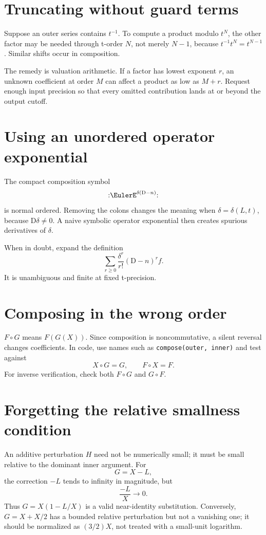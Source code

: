 \documentclass[11pt,openany]{book}
\theoremstyle{definition}
\theoremstyle{plain}
\theoremstyle{remark}
\newcommand{\Dop}{\mathrm{D}}
\newcommand{\compose}{\mathbin{\circ}}
\begin{document}
\section{Truncating without guard terms}
Suppose an outer series contains \(t^{-1}\).  To compute a product modulo
\(t^N\), the other factor may be needed through t-order \(N\), not merely
\(N-1\), because \(t^{-1}t^N=t^{N-1}\).  Similar shifts occur in composition.

The remedy is valuation arithmetic.  If a factor has lowest exponent \(r\), an
unknown coefficient at order \(M\) can affect a product as low as \(M+r\).
Request enough input precision so that every omitted contribution lands at or
beyond the output cutoff.

\section{Using an unordered operator exponential}
The compact composition symbol
\[
 \mathopen{:}\EulerE^{\delta(\Dop-n)}\mathclose{:}
\]
is normal ordered.  Removing the colons changes the meaning when
\(\delta=\delta(L,t)\), because \(\Dop\delta\ne0\).  A naive symbolic operator
exponential then creates spurious derivatives of \(\delta\).

When in doubt, expand the definition
\[
 \sum_{r\ge0}\frac{\delta^r}{r!}(\Dop-n)^rf.
\]
It is unambiguous and finite at fixed t-precision.

\section{Composing in the wrong order}
\(F\compose G\) means \(F(G(X))\).  Since composition is noncommutative, a
silent reversal changes coefficients.  In code, use names such as
\texttt{compose(outer, inner)} and test against
\[
 X\compose G=G,
 \qquad
 F\compose X=F.
\]
For inverse verification, check both \(F\compose G\) and \(G\compose F\).

\section{Forgetting the relative smallness condition}
An additive perturbation \(H\) need not be numerically small; it must be small
relative to the dominant inner argument.  For
\[
 G=X-L,
\]
the correction \(-L\) tends to infinity in magnitude, but
\[
 \frac{-L}{X}\to0.
\]
Thus \(G=X(1-L/X)\) is a valid near-identity substitution.  Conversely,
\(G=X+X/2\) has a bounded relative perturbation but not a vanishing one; it
should be normalized as \((3/2)X\), not treated with a small-unit logarithm.
\end{document}
